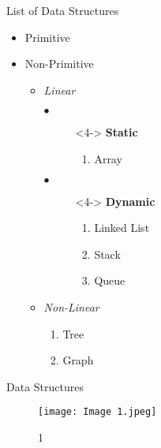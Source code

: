 \documentclass{beamer}
\begin{document}
\begin{frame}{List of Data Structures}%
\transblindshorizontal%
    \begin{itemize}%
        \item Primitive \pause
        \item Non-Primitive \pause  \newline \\
        \begin{itemize}%
            \item \textit{Linear}
            \begin{description}
                \item[$\bullet$]<4-> \textbf{Static}%
                \begin{enumerate}%
                    \item<5-> Array \newline
                \end{enumerate}
                \item[$\bullet$]<4-> \textbf{Dynamic}%
                \begin{enumerate}%
                    \item<5-> Linked List
                    \item<5-> Stack
                    \item<5-> Queue \newline
                \end{enumerate}
            \end{description}
            \item \textit{Non-Linear}%
            \begin{enumerate}%
                \item<6-> Tree
                \item<6-> Graph
            \end{enumerate}
        \end{itemize}
    \end{itemize}
\end{frame}

\begin{frame}{Data Structures}%
\begin{figure}
\centering
\texttt{[image: Image 1.jpeg]}%
\caption{1}

\end{figure}
\end{frame}
\end{document}
